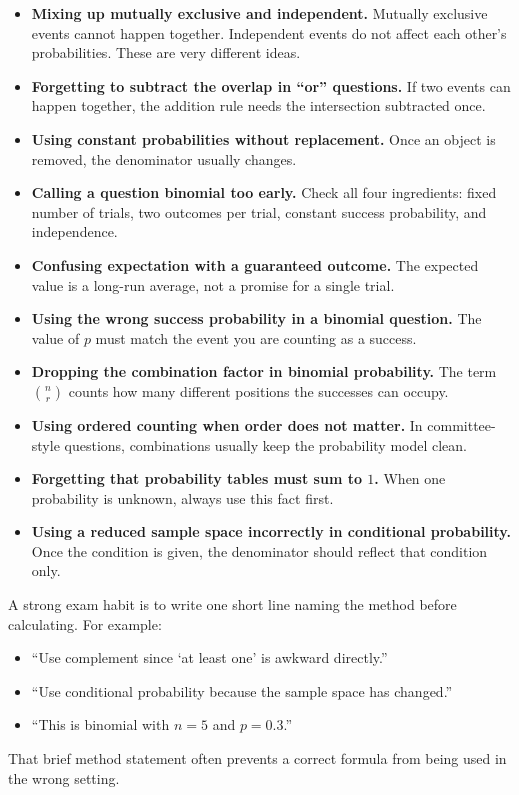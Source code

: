\begin{itemize}[leftmargin=*]
  \item \textbf{Mixing up mutually exclusive and independent.} Mutually exclusive events cannot happen together. Independent events do not affect each other's probabilities. These are very different ideas.
  \item \textbf{Forgetting to subtract the overlap in ``or'' questions.} If two events can happen together, the addition rule needs the intersection subtracted once.
  \item \textbf{Using constant probabilities without replacement.} Once an object is removed, the denominator usually changes.
  \item \textbf{Calling a question binomial too early.} Check all four ingredients: fixed number of trials, two outcomes per trial, constant success probability, and independence.
  \item \textbf{Confusing expectation with a guaranteed outcome.} The expected value is a long-run average, not a promise for a single trial.
  \item \textbf{Using the wrong success probability in a binomial question.} The value of $p$ must match the event you are counting as a success.
  \item \textbf{Dropping the combination factor in binomial probability.} The term $\binom{n}{r}$ counts how many different positions the successes can occupy.
  \item \textbf{Using ordered counting when order does not matter.} In committee-style questions, combinations usually keep the probability model clean.
  \item \textbf{Forgetting that probability tables must sum to $1$.} When one probability is unknown, always use this fact first.
  \item \textbf{Using a reduced sample space incorrectly in conditional probability.} Once the condition is given, the denominator should reflect that condition only.
\end{itemize}

\noindent A strong exam habit is to write one short line naming the method before calculating. For example:
\begin{itemize}[leftmargin=*]
  \item ``Use complement since `at least one' is awkward directly.''
  \item ``Use conditional probability because the sample space has changed.''
  \item ``This is binomial with $n=5$ and $p=0.3$.''
\end{itemize}

\noindent That brief method statement often prevents a correct formula from being used in the wrong setting.
